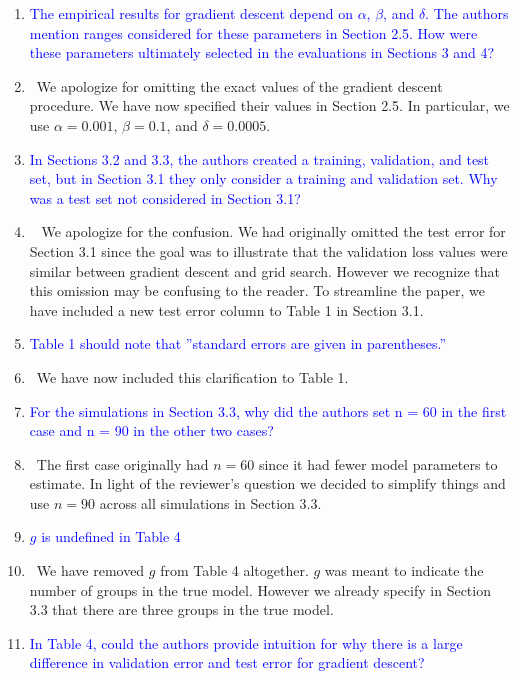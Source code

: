 \documentclass[]{article}
\newcommand{\point}[1]{\item \textcolor{blue}{#1}}
\newcommand{\reply}{\item[]\ }
\begin{document}
\begin{enumerate}
		\point{The empirical results for gradient descent depend on $\alpha$, $\beta$, and $\delta$. The authors mention ranges considered for these parameters in Section 2.5. How were these parameters ultimately selected in the evaluations in Sections 3 and 4?}
		
		\reply We apologize for omitting the exact values of the gradient descent procedure. We have now specified their values in Section 2.5. In particular, we use $\alpha = 0.001$, $\beta = 0.1$, and $\delta = 0.0005$.
		
		\point{In Sections 3.2 and 3.3, the authors created a training, validation, and test set, but in Section 3.1 they only consider a training and validation set. Why was a test set not considered in Section 3.1?}
		
		\reply 
		We apologize for the confusion. We had originally omitted the test error for Section 3.1 since the goal was to illustrate that the validation loss values were similar between gradient descent and grid search. However we recognize that this omission may be confusing to the reader. To streamline the paper, we have included a new test error column to Table 1 in Section 3.1.
		
		\point{Table 1 should note that ”standard errors are given in parentheses.”}
		
		\reply We have now included this clarification to Table 1.
		
		\point{For the simulations in Section 3.3, why did the authors set n = 60 in the first case and
n = 90 in the other two cases?}
		
		\reply The first case originally had $n = 60$ since it had fewer model parameters to estimate. In light of the reviewer's question we decided to simplify things and use $n = 90$ across all simulations in Section 3.3.
		
		\point{$g$ is undefined in Table 4}
		
		\reply We have removed $g$ from Table 4 altogether. $g$ was meant to indicate the number of groups in the true model. However we already specify in Section 3.3 that there are three groups in the true model.
		
		\point{In Table 4, could the authors provide intuition for why there is a large difference in validation error and test error for gradient descent?}
		

\end{enumerate}
\end{document}

